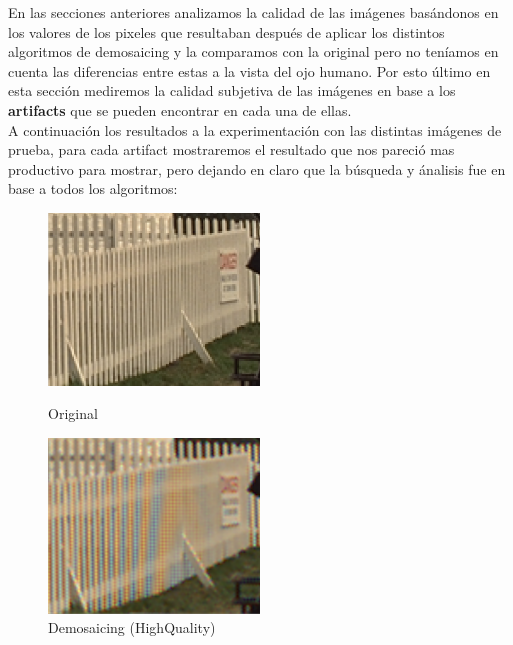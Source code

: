 {En las secciones anteriores analizamos la calidad de las imágenes basándonos en los valores de los pixeles que resultaban después de aplicar los distintos algoritmos de demosaicing y la comparamos con la original pero no teníamos en cuenta las diferencias entre estas a la vista del ojo humano. Por esto último en esta sección mediremos la calidad subjetiva de las imágenes en base a los \textbf{artifacts} que se pueden encontrar en cada una de ellas.\\
A continuación los resultados a la experimentación con las distintas imágenes de prueba, para cada artifact mostraremos el resultado que nos pareció mas productivo para mostrar, pero dejando en claro que la búsqueda y ánalisis fue en base a todos los algoritmos:
\newpage
{}
\begin{figure}[htb]
\begin{center}
       \includegraphics[width=0.5\textwidth]{imagenes/img8_moire_original.png}
        \caption{Original}
        \end{center}
\endminipage
{}
\begin{center}
       \includegraphics[width=0.5\textwidth]{imagenes/img8_moire.png}
        \caption{Demosaicing (HighQuality)}
         \end{center}
\endminipage

\end{figure}

}

